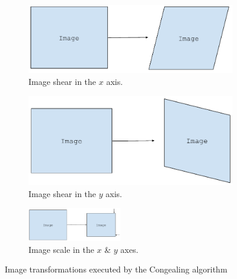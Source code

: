 \begin{center}
\begin{figure}[H]
      \begin{subfigure}[b]{0.45\textwidth}
          \centering
        \includegraphics[width=\textwidth]{Chapter1/lit-review-img/xshear.pdf}
        \caption{Image shear in the $x$ axis.}
        \label{fig:x-shear}
      \end{subfigure} \hfill
      \begin{subfigure}[b]{0.45\textwidth}
          \centering
        \includegraphics[width=\textwidth]{Chapter1/lit-review-img/yshear.pdf}
        \caption{Image shear in the $y$ axis.}
        \label{fig:y-shear}
      \end{subfigure}

      \begin{subfigure}[b]{\textwidth}
        \centering
        \includegraphics[width=0.45\textwidth]{Chapter1/lit-review-img/scale.pdf}
        \caption{Image scale in the $x$ \& $y$ axes.}
        \label{fig:scale}
      \end{subfigure}
    \caption{Image transformations executed by the Congealing algorithm}
    \label{fig:image-transformations}
  \end{figure}
\end{center}

\vspace{-1cm}

